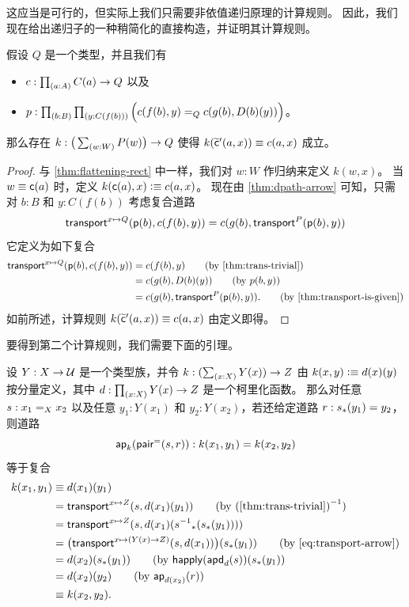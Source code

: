 这应当是可行的，但实际上我们只需要非依值递归原理的计算规则。
因此，我们现在给出递归子的一种稍简化的直接构造，并证明其计算规则。

\begin{lem}\label{thm:flattening-rectnd}
  假设 $Q$ 是一个类型，并且我们有
  \begin{itemize}
  \item $c : \prd{a:A} C(a) \to Q$ 以及
  \item $p : \prd{b:B}{y:C(f(b))} \Big(c(f(b),y) =_Q c(g(b),D(b)(y))\Big)$。
  \end{itemize}
  那么存在 $k:\big(\sm{w:W} P(w)\big) \to Q$ 使得 $k(\cct'(a,x)) \jdeq c(a,x)$ 成立。
\end{lem}

\begin{proof}
  与 \cref{thm:flattening-rect} 中一样，我们对 $w:W$ 作归纳来定义 $k(w,x)$。
  当 $w\jdeq \cc(a)$ 时，定义 $k(\cc(a),x)\defeq c(a,x)$。
  现在由 \cref{thm:dpath-arrow} 可知，只需对 $b:B$ 和 $y:C(f(b))$ 考虑复合道路
  \begin{equation}\label{eq:flattening-rectnd}
    \transfib{x\mapsto Q}{\pp(b)}{c(f(b),y)}
    = c(g(b),\transfib{P}{\pp(b)}{y})
  \end{equation}
  它定义为如下复合
  \begin{align}
    \transfib{x\mapsto Q}{\pp(b)}{c(f(b),y)}
    &= c(f(b),y) \tag{by \cref{thm:trans-trivial}}\\
    &= c(g(b),D(b)(y)) \tag{by $p(b,y)$}\\
    &= c(g(b),\transfib{P}{\pp(b)}{y}). \tag{by \cref{thm:transport-is-given}}
  \end{align}
  如前所述，计算规则 $k(\cct'(a,x)) \jdeq c(a,x)$ 由定义即得。
\end{proof}

要得到第二个计算规则，我们需要下面的引理。

\begin{lem}\label{thm:ap-sigma-rect-path-pair}
  设 $Y:X\to\type$ 是一个类型族，并令 $k:(\sm{x:X}Y(x)) \to Z$ 由 $k(x,y) \defeq d(x)(y)$ 按分量定义，其中 $d:\prd{x:X} Y(x)\to Z$ 是一个柯里化函数。
  那么对任意 $s:\id[X]{x_1}{x_2}$ 以及任意 $y_1:Y(x_1)$ 和 $y_2:Y(x_2)$，若还给定道路 $r:\trans{s}{y_1}=y_2$，则道路
  \[\apfunc k (\pairpath(s,r)) :k(x_1,y_1) = k(x_2,y_2)\]
  等于复合
  \begin{align}
    k(x_1,y_1)
    &\jdeq d(x_1)(y_1) \notag\\
    &= \transfib{x\mapsto Z}{s}{d(x_1)(y_1)}
    \tag{by $\opp{\text{(\cref{thm:trans-trivial})}}$}\\
    &= \transfib{x\mapsto Z}{s}{d(x_1)(\trans{\opp s}{\trans{s}{y_1}})}
    \notag\\
    &= \big(\transfib{x\mapsto (Y(x)\to Z)}{s}{d(x_1)}\big)(\trans{s}{y_1})
    \tag{by~\eqref{eq:transport-arrow}}\\
    &= d(x_2)(\trans{s}{y_1})
    \tag{by $\happly(\apdfunc{d}(s))(\trans{s}{y_1}$}\\
    &= d(x_2)(y_2)
    \tag{by $\apfunc{d(x_2)}(r)$}\\
    &\jdeq k(x_2,y_2).
    \notag
  \end{align}
\end{lem}

